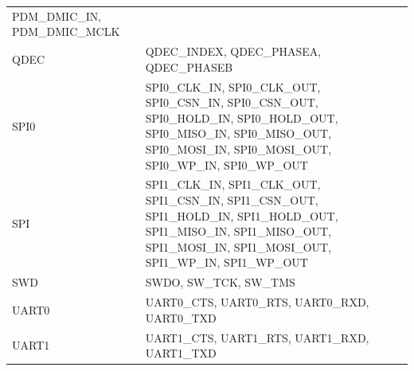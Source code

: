 \documentclass[
  12pt,
]{book}
\begin{document}
\begin{longtable}[]{@{}ll@{}}
\begin{minipage}[t]{0.85\columnwidth}
PDM\_DMIC\_IN, PDM\_DMIC\_MCLK\strut
\end{minipage}\tabularnewline
\begin{minipage}[t]{0.09\columnwidth}\raggedright
QDEC\strut
\end{minipage} & \begin{minipage}[t]{0.85\columnwidth}\raggedright
QDEC\_INDEX, QDEC\_PHASEA, QDEC\_PHASEB\strut
\end{minipage}\tabularnewline
\begin{minipage}[t]{0.09\columnwidth}\raggedright
SPI0\strut
\end{minipage} & \begin{minipage}[t]{0.85\columnwidth}\raggedright
SPI0\_CLK\_IN, SPI0\_CLK\_OUT, SPI0\_CSN\_IN, SPI0\_CSN\_OUT, SPI0\_HOLD\_IN, SPI0\_HOLD\_OUT, SPI0\_MISO\_IN, SPI0\_MISO\_OUT, SPI0\_MOSI\_IN, SPI0\_MOSI\_OUT, SPI0\_WP\_IN, SPI0\_WP\_OUT\strut
\end{minipage}\tabularnewline
\begin{minipage}[t]{0.09\columnwidth}\raggedright
SPI\strut
\end{minipage} & \begin{minipage}[t]{0.85\columnwidth}\raggedright
SPI1\_CLK\_IN, SPI1\_CLK\_OUT, SPI1\_CSN\_IN, SPI1\_CSN\_OUT, SPI1\_HOLD\_IN, SPI1\_HOLD\_OUT, SPI1\_MISO\_IN, SPI1\_MISO\_OUT, SPI1\_MOSI\_IN, SPI1\_MOSI\_OUT, SPI1\_WP\_IN, SPI1\_WP\_OUT\strut
\end{minipage}\tabularnewline
\begin{minipage}[t]{0.09\columnwidth}\raggedright
SWD\strut
\end{minipage} & \begin{minipage}[t]{0.85\columnwidth}\raggedright
SWDO, SW\_TCK, SW\_TMS\strut
\end{minipage}\tabularnewline
\begin{minipage}[t]{0.09\columnwidth}\raggedright
UART0\strut
\end{minipage} & \begin{minipage}[t]{0.85\columnwidth}\raggedright
UART0\_CTS, UART0\_RTS, UART0\_RXD, UART0\_TXD\strut
\end{minipage}\tabularnewline
\begin{minipage}[t]{0.09\columnwidth}\raggedright
UART1\strut
\end{minipage} & \begin{minipage}[t]{0.85\columnwidth}\raggedright
UART1\_CTS, UART1\_RTS, UART1\_RXD, UART1\_TXD\strut
\end{minipage}\tabularnewline
\bottomrule
\end{longtable}
\end{document}
